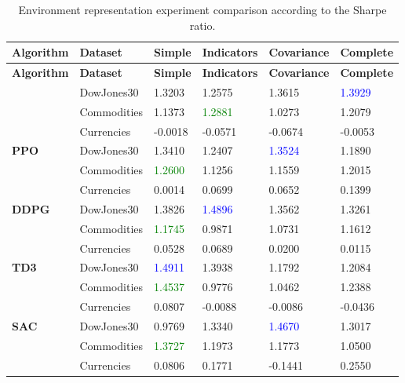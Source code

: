 \begin{longtable}{|p{2cm}|p{2.2cm}|p{2cm}|p{2cm}|p{2.2cm}|p{2cm}|}
    \hline
    \textbf{Algorithm} & \textbf{Dataset} & \textbf{Simple} & \textbf{Indicators} & \textbf{Covariance} & \textbf{Complete} \\ \midrule
    \endfirsthead

    \hline
    \textbf{Algorithm} & \textbf{Dataset} & \textbf{Simple} & \textbf{Indicators} & \textbf{Covariance} & \textbf{Complete}  \\ \midrule
    \endhead

    \caption{Environment representation experiment comparison according to the Sharpe ratio.}
    \label{tab:experiment_environment_sharpe}

    \endfoot

    \hline  
    \multirow{3}{*}{\textbf{A2C}}
    & DowJones30 & 1.3203 & 1.2575 & 1.3615 & \textcolor{blue}{1.3929} \\ \cline{2-6}
    & Commodities & 1.1373 & \textcolor{green}{1.2881} & 1.0273 & 1.2079 \\ \cline{2-6}
    & Currencies & -0.0018 & -0.0571 & -0.0674 & -0.0053 \\ \midrule

    \multirow{3}{*}{\textbf{PPO}}
    & DowJones30 & 1.3410 & 1.2407 & \textcolor{blue}{1.3524} & 1.1890 \\ \cline{2-6}
    & Commodities & \textcolor{green}{1.2600} & 1.1256 & 1.1559 & 1.2015 \\ \cline{2-6}
    & Currencies & 0.0014 & 0.0699 & 0.0652 & 0.1399 \\ \midrule

    \multirow{3}{*}{\textbf{DDPG}}
    & DowJones30 & 1.3826 & \textcolor{blue}{1.4896} & 1.3562 & 1.3261 \\ \cline{2-6}
    & Commodities & \textcolor{green}{1.1745} & 0.9871 & 1.0731 & 1.1612 \\ \cline{2-6}
    & Currencies & 0.0528 & 0.0689 & 0.0200 & 0.0115 \\ \midrule

    \multirow{3}{*}{\textbf{TD3}}
    & DowJones30 & \textcolor{blue}{1.4911} & 1.3938 & 1.1792 & 1.2084 \\ \cline{2-6}
    & Commodities & \textcolor{green}{1.4537} & 0.9776 & 1.0462 & 1.2388 \\ \cline{2-6}
    & Currencies & 0.0807 & -0.0088 & -0.0086 & -0.0436 \\ \midrule

    \multirow{3}{*}{\textbf{SAC}}
    & DowJones30 & 0.9769 & 1.3340 & \textcolor{blue}{1.4670} & 1.3017 \\ \cline{2-6}
    & Commodities & \textcolor{green}{1.3727} & 1.1973 & 1.1773 & 1.0500 \\ \cline{2-6}
    & Currencies & 0.0806 & 0.1771 & -0.1441 & 0.2550 \\ \midrule

\end{longtable}